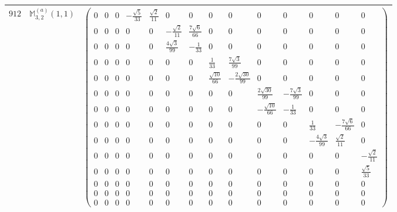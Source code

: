 \documentclass[fleqn,8pt,landscape]{jsarticle}
\begin{document}
\begin{center}
\begin{longtable}{ccc}
$ 912 $ & $ \mathbb{M}_{3,2}^{(a)}(1,1) $ & $ \begin{pmatrix} 0 & 0 & 0 & - \frac{\sqrt{5}}{33} & \frac{\sqrt{2}}{11} & 0 & 0 & 0 & 0 & 0 & 0 & 0 & 0 & 0 \\ 0 & 0 & 0 & 0 & 0 & - \frac{\sqrt{2}}{11} & \frac{7 \sqrt{6}}{66} & 0 & 0 & 0 & 0 & 0 & 0 & 0 \\ 0 & 0 & 0 & 0 & 0 & \frac{4 \sqrt{3}}{99} & - \frac{1}{33} & 0 & 0 & 0 & 0 & 0 & 0 & 0 \\ 0 & 0 & 0 & 0 & 0 & 0 & 0 & \frac{1}{33} & \frac{7 \sqrt{3}}{99} & 0 & 0 & 0 & 0 & 0 \\ 0 & 0 & 0 & 0 & 0 & 0 & 0 & \frac{\sqrt{10}}{66} & - \frac{2 \sqrt{30}}{99} & 0 & 0 & 0 & 0 & 0 \\ 0 & 0 & 0 & 0 & 0 & 0 & 0 & 0 & 0 & \frac{2 \sqrt{30}}{99} & - \frac{7 \sqrt{3}}{99} & 0 & 0 & 0 \\ 0 & 0 & 0 & 0 & 0 & 0 & 0 & 0 & 0 & - \frac{\sqrt{10}}{66} & - \frac{1}{33} & 0 & 0 & 0 \\ 0 & 0 & 0 & 0 & 0 & 0 & 0 & 0 & 0 & 0 & 0 & \frac{1}{33} & - \frac{7 \sqrt{6}}{66} & 0 \\ 0 & 0 & 0 & 0 & 0 & 0 & 0 & 0 & 0 & 0 & 0 & - \frac{4 \sqrt{3}}{99} & \frac{\sqrt{2}}{11} & 0 \\ 0 & 0 & 0 & 0 & 0 & 0 & 0 & 0 & 0 & 0 & 0 & 0 & 0 & - \frac{\sqrt{2}}{11} \\ 0 & 0 & 0 & 0 & 0 & 0 & 0 & 0 & 0 & 0 & 0 & 0 & 0 & \frac{\sqrt{5}}{33} \\ 0 & 0 & 0 & 0 & 0 & 0 & 0 & 0 & 0 & 0 & 0 & 0 & 0 & 0 \\ 0 & 0 & 0 & 0 & 0 & 0 & 0 & 0 & 0 & 0 & 0 & 0 & 0 & 0 \\ 0 & 0 & 0 & 0 & 0 & 0 & 0 & 0 & 0 & 0 & 0 & 0 & 0 & 0 \end{pmatrix} $ \\ \hline

\end{longtable}
\end{center}
\end{document}
